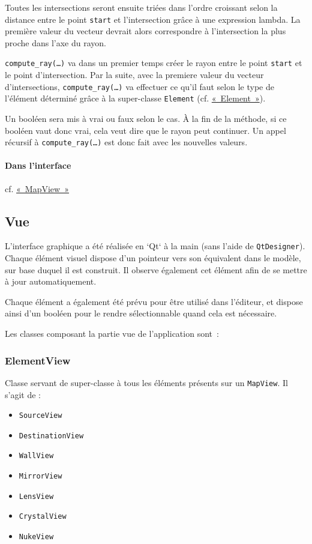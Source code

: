 \documentclass[]{report}
\begin{document}
Toutes les intersections seront ensuite triées dans l'ordre croissant selon la distance entre le point \texttt{start} et
l'intersection grâce à une expression lambda.
La première valeur du vecteur devrait alors correspondre à l'intersection la plus proche dans l'axe du rayon.

\texttt{compute\_ray(\dots)} va dans un premier temps créer le rayon entre le point \texttt{start} et le point d'intersection.
Par la suite, avec la premiere valeur du vecteur d'intersections, 
\texttt{compute\_ray(\dots)} va effectuer ce qu'il faut selon le type de l'élément déterminé 
grâce à la super-classe \texttt{Element} (cf. \hyperref[Element]{«~Element~»}).

Un booléen sera mis à vrai ou faux selon le cas. À la fin de la méthode, si ce booléen vaut donc vrai, cela veut dire
que le rayon peut continuer. Un appel récursif à \texttt{compute\_ray(\dots)} est donc fait avec les nouvelles valeurs. 

\paragraph{Dans l'interface} cf. \hyperref[MapView]{«~MapView~»}    

\subsection{Vue}

L’interface graphique a été réalisée en `Qt` à la main (sans l'aide de \texttt{QtDesigner}).
Chaque élément visuel dispose d’un pointeur vers son
équivalent dans le modèle, sur base duquel il est construit. Il observe également cet élément afin de se mettre
à jour automatiquement.

Chaque élément a également été prévu pour être utilisé dans l’éditeur, et dispose ainsi d’un booléen pour le rendre 
sélectionnable quand cela est nécessaire.

Les classes composant la partie vue de l’application sont~:

\subsubsection{ElementView}

Classe servant de super-classe à tous les éléments présents sur un \texttt{MapView}.
Il s'agit de :

\begin{itemize}
    \item \texttt{SourceView}
    \item \texttt{DestinationView}
    \item \texttt{WallView}
    \item \texttt{MirrorView}
    \item \texttt{LensView}
    \item \texttt{CrystalView}
    \item \texttt{NukeView}
\end{itemize}
\end{document}
